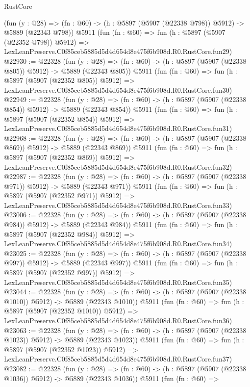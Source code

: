 \begin{lexlean}{RustCore}
\begin{coremodule}
    (fun (y : @28) => (fn : @60) -> (h : @5897 (@5907 (@22338 @798)) @5912) -> @5889 (@22343 @798))
    @5911
    (fun (fn : @60) =>
    fun (h : @5897 (@5907 (@22352 @798)) @5912) =>
    LexLeanPreserve.C0f85ceb5885d5d4d654d8e475f6b908d.R0.RustCore.fun29)
@22930 := @22328
    (fun (y : @28) => (fn : @60) -> (h : @5897 (@5907 (@22338 @805)) @5912) -> @5889 (@22343 @805))
    @5911
    (fun (fn : @60) =>
    fun (h : @5897 (@5907 (@22352 @805)) @5912) =>
    LexLeanPreserve.C0f85ceb5885d5d4d654d8e475f6b908d.R0.RustCore.fun30)
@22949 := @22328
    (fun (y : @28) => (fn : @60) -> (h : @5897 (@5907 (@22338 @854)) @5912) -> @5889 (@22343 @854))
    @5911
    (fun (fn : @60) =>
    fun (h : @5897 (@5907 (@22352 @854)) @5912) =>
    LexLeanPreserve.C0f85ceb5885d5d4d654d8e475f6b908d.R0.RustCore.fun31)
@22968 := @22328
    (fun (y : @28) => (fn : @60) -> (h : @5897 (@5907 (@22338 @869)) @5912) -> @5889 (@22343 @869))
    @5911
    (fun (fn : @60) =>
    fun (h : @5897 (@5907 (@22352 @869)) @5912) =>
    LexLeanPreserve.C0f85ceb5885d5d4d654d8e475f6b908d.R0.RustCore.fun32)
@22987 := @22328
    (fun (y : @28) => (fn : @60) -> (h : @5897 (@5907 (@22338 @971)) @5912) -> @5889 (@22343 @971))
    @5911
    (fun (fn : @60) =>
    fun (h : @5897 (@5907 (@22352 @971)) @5912) =>
    LexLeanPreserve.C0f85ceb5885d5d4d654d8e475f6b908d.R0.RustCore.fun33)
@23006 := @22328
    (fun (y : @28) => (fn : @60) -> (h : @5897 (@5907 (@22338 @984)) @5912) -> @5889 (@22343 @984))
    @5911
    (fun (fn : @60) =>
    fun (h : @5897 (@5907 (@22352 @984)) @5912) =>
    LexLeanPreserve.C0f85ceb5885d5d4d654d8e475f6b908d.R0.RustCore.fun34)
@23025 := @22328
    (fun (y : @28) => (fn : @60) -> (h : @5897 (@5907 (@22338 @997)) @5912) -> @5889 (@22343 @997))
    @5911
    (fun (fn : @60) =>
    fun (h : @5897 (@5907 (@22352 @997)) @5912) =>
    LexLeanPreserve.C0f85ceb5885d5d4d654d8e475f6b908d.R0.RustCore.fun35)
@23044 := @22328
    (fun (y : @28) =>
    (fn : @60) -> (h : @5897 (@5907 (@22338 @1010)) @5912) -> @5889 (@22343 @1010))
    @5911
    (fun (fn : @60) =>
    fun (h : @5897 (@5907 (@22352 @1010)) @5912) =>
    LexLeanPreserve.C0f85ceb5885d5d4d654d8e475f6b908d.R0.RustCore.fun36)
@23063 := @22328
    (fun (y : @28) =>
    (fn : @60) -> (h : @5897 (@5907 (@22338 @1023)) @5912) -> @5889 (@22343 @1023))
    @5911
    (fun (fn : @60) =>
    fun (h : @5897 (@5907 (@22352 @1023)) @5912) =>
    LexLeanPreserve.C0f85ceb5885d5d4d654d8e475f6b908d.R0.RustCore.fun37)
@23082 := @22328
    (fun (y : @28) =>
    (fn : @60) -> (h : @5897 (@5907 (@22338 @1036)) @5912) -> @5889 (@22343 @1036))
    @5911
    (fun (fn : @60) =>

\end{coremodule}
\end{lexlean}
